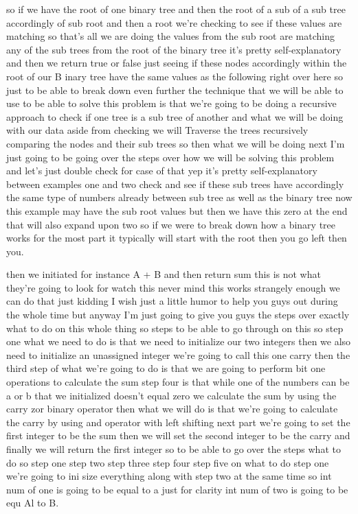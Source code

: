 \expandafter\def\csname sourceexcerpt@60\endcsname{%
so if we have the root of one binary tree and then the root of a sub of a sub tree
accordingly of sub root and then a root we're checking to see if these values are
matching so that's all we are doing the values from the sub root are matching any of
the sub trees from the root of the binary tree it's pretty self-explanatory and then
we return true or false just seeing if these nodes accordingly within the root of our
B inary tree have the same values as the following right over here so just to be able
to break down even further the technique that we will be able to use to be able to
solve this problem is that we're going to be doing a recursive approach to check if
one tree is a sub tree of another and what we will be doing with our data aside from
checking we will Traverse the trees recursively comparing the nodes and their sub
trees so then what we will be doing next I'm just going to be going over the steps
over how we will be solving this problem and let's just double check for case of that
yep it's pretty self-explanatory between examples one and two check and see if these
sub trees have accordingly the same type of numbers already between sub tree as well
as the binary tree now this example may have the sub root values but then we have this
zero at the end that will also expand upon two so if we were to break down how a
binary tree works for the most part it typically will start with the root then you go
left then you.
}

\expandafter\def\csname sourceexcerpt@61\endcsname{%
then we initiated for instance A + B and then return sum this is not what they're
going to look for watch this never mind this works strangely enough we can do that
just kidding I wish just a little humor to help you guys out during the whole time but
anyway I'm just going to give you guys the steps over exactly what to do on this whole
thing so steps to be able to go through on this so step one what we need to do is that
we need to initialize our two integers then we also need to initialize an unassigned
integer we're going to call this one carry then the third step of what we're going to
do is that we are going to perform bit one operations to calculate the sum step four
is that while one of the numbers can be a or b that we initialized doesn't equal zero
we calculate the sum by using the carry zor binary operator then what we will do is
that we're going to calculate the carry by using and operator with left shifting next
part we're going to set the first integer to be the sum then we will set the second
integer to be the carry and finally we will return the first integer so to be able to
go over the steps what to do so step one step two step three step four step five on
what to do step one we're going to ini size everything along with step two at the same
time so int num of one is going to be equal to a just for clarity int num of two is
going to be equ Al to B.
}

